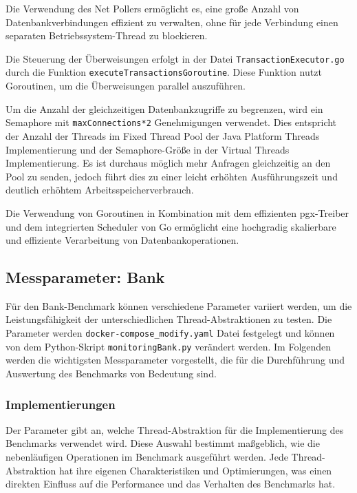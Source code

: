 \documentclass[fontsize=12pt,paper=a4,twoside=semi,parskip=half-,headsepline,headinclude]{scrreprt}
\begin{document}
Die Verwendung des Net Pollers ermöglicht es, eine große Anzahl von Datenbankverbindungen effizient zu verwalten, ohne für jede Verbindung einen separaten Betriebssystem-Thread zu blockieren.

Die Steuerung der Überweisungen erfolgt in der Datei \texttt{TransactionExecutor.go} durch die Funktion \texttt{executeTransactionsGoroutine}. Diese Funktion nutzt Goroutinen, um die Überweisungen parallel auszuführen.

Um die Anzahl der gleichzeitigen Datenbankzugriffe zu begrenzen, wird ein Semaphore mit \texttt{maxConnections*2} Genehmigungen verwendet. Dies entspricht der Anzahl der Threads im Fixed Thread Pool der Java Platform Threads Implementierung und der Semaphore-Größe in der Virtual Threads Implementierung. Es ist durchaus möglich mehr Anfragen gleichzeitig an den Pool zu senden, jedoch führt dies zu einer leicht erhöhten Ausführungszeit und deutlich erhöhtem Arbeitsspeicherverbrauch.

Die Verwendung von Goroutinen in Kombination mit dem effizienten pgx-Treiber und dem integrierten Scheduler von Go ermöglicht eine hochgradig skalierbare und effiziente Verarbeitung von Datenbankoperationen.

\subsection{Messparameter: Bank}

Für den Bank-Benchmark können verschiedene Parameter variiert werden, um die Leistungsfähigkeit der unterschiedlichen Thread-Abstraktionen zu testen. Die Parameter werden \texttt{docker-compose\_modify.yaml} Datei festgelegt und können von dem Python-Skript \texttt{monitoringBank.py} verändert werden. Im Folgenden werden die wichtigsten Messparameter vorgestellt, die für die Durchführung und Auswertung des Benchmarks von Bedeutung sind.

\subsubsection{Implementierungen}

Der Parameter gibt an, welche Thread-Abstraktion für die Implementierung des Benchmarks verwendet wird. Diese Auswahl bestimmt maßgeblich, wie die nebenläufigen Operationen im Benchmark ausgeführt werden. Jede Thread-Abstraktion hat ihre eigenen Charakteristiken und Optimierungen, was einen direkten Einfluss auf die Performance und das Verhalten des Benchmarks hat.
\end{document}
